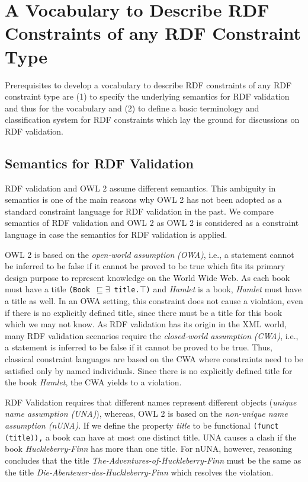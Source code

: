 \documentclass[a4paper,fontsize=11pt]{scrartcl}
\newcommand{\ms}[1]{\texttt{#1}}
\begin{document}
\section{A Vocabulary to Describe RDF Constraints of any RDF Constraint Type} 
\label{sec:vocabulary}

Prerequisites to develop a vocabulary to describe RDF constraints of any RDF constraint type are (1) to specify the underlying semantics for RDF validation and thus for the vocabulary and (2) to define a basic terminology and classification system for RDF constraints which lay the ground for discussions on RDF validation.

\subsection{Semantics for RDF Validation}

RDF validation and OWL 2 assume different semantics. 
This ambiguity in semantics is one of the main reasons why OWL 2 has not been adopted as a standard constraint language for RDF validation in the past.
We compare semantics of RDF validation and OWL 2 as OWL 2 is considered as a constraint language 
in case the semantics for RDF validation is applied.

OWL 2 is based on the {\em open-world assumption} \emph{(OWA)}, i.e., a statement cannot be inferred to be false if it cannot be proved to be true  which fits its primary design purpose to represent knowledge on the World Wide Web. 
As each book must have a title {\small\ms{(Book $\sqsubseteq \exists$ title.$\top$)}} and {\em Hamlet} is a book, %
{\em Hamlet} must have a title as well.
In an OWA setting, this constraint does not cause a violation, even if there is no explicitly defined title, since there must be a title for this book which we may not know. 
As RDF validation has its origin in the XML world,
many RDF validation scenarios require the {\em closed-world assumption} \emph{(CWA)}, i.e., a statement is inferred to be false if it cannot be proved to be true.
Thus, classical constraint languages are based on the CWA where constraints need to be satisfied only by named individuals. 
Since there is no explicitly defined title for the book {\em Hamlet}, the CWA yields to a violation. 

RDF Validation requires that different names represent different objects (\emph{unique name assumption (UNA)}), whereas,
OWL 2 is based on the {\em non-unique name assumption (nUNA)}.  
If we define the property \emph{title} to be functional {\small\ms{(funct (title)),}} a book can have at most one distinct title.
UNA causes a clash
if the book {\em Huckleberry-Finn} has more than one title.
For nUNA, however, reasoning concludes that the title {\em The-Adventures-of-Huckleberry-Finn} must be the same as the title {\em Die-Abenteuer-des-Huckleberry-Finn} 
which resolves the violation. 
\end{document}
